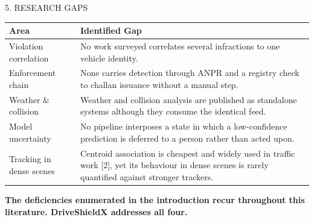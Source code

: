 \documentclass[aspectratio=169,10pt,t]{beamer}
\begin{document}
\begin{frame}{5. RESEARCH GAPS}
\small
\centering
\begin{tabularx}{0.94\textwidth}{@{}L{0.25\textwidth}Y@{}}
\toprule
\textbf{Area} & \textbf{Identified Gap}\\
\midrule
Violation correlation   & No work surveyed correlates several infractions to one vehicle identity.\\
Enforcement chain       & None carries detection through ANPR and a registry check to challan issuance without a manual step.\\
Weather \& collision    & Weather and collision analysis are published as standalone systems although they consume the identical feed.\\
Model uncertainty       & No pipeline interposes a state in which a low-confidence prediction is deferred to a person rather than acted upon.\\
\midrule
Tracking in dense scenes& Centroid association is cheapest and widely used in traffic work [2], yet its behaviour in dense scenes is rarely quantified against stronger trackers.\\
\bottomrule
\end{tabularx}
\vspace{0.6em}

{\color{dsblue}\textbf{The deficiencies enumerated in the introduction recur throughout this literature.
DriveShieldX addresses all four.}}
\end{frame}
\end{document}
